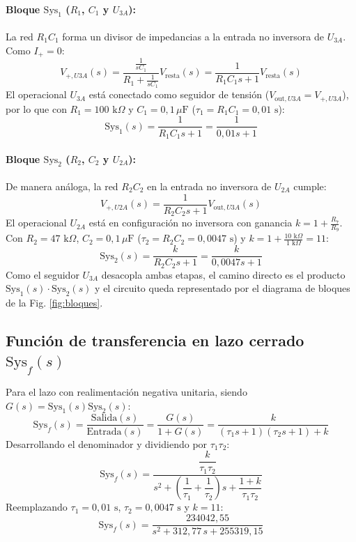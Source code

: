 \documentclass[11pt,a4paper]{article}
\begin{document}
\paragraph{Bloque $\text{Sys}_1$ ($R_1$, $C_1$ y $U_{3A}$):}
La red $R_1 C_1$ forma un divisor de impedancias a la entrada no inversora de $U_{3A}$. Como $I_+ = 0$:
\begin{equation}
    V_{+,U3A}(s) = \frac{\frac{1}{sC_1}}{R_1 + \frac{1}{sC_1}} V_{\text{resta}}(s) = \frac{1}{R_1 C_1 s + 1} V_{\text{resta}}(s)
\end{equation}
El operacional $U_{3A}$ está conectado como seguidor de tensión ($V_{\text{out},U3A} = V_{+,U3A}$), por lo que con $R_1 = 100\text{ k}\Omega$ y $C_1 = 0,1\,\mu\text{F}$ ($\tau_1 = R_1 C_1 = 0,01\text{ s}$):
\begin{equation}
    \text{Sys}_1(s) = \frac{1}{R_1 C_1 s + 1} = \frac{1}{0,01 s + 1}
\end{equation}

\paragraph{Bloque $\text{Sys}_2$ ($R_2$, $C_2$ y $U_{2A}$):}
De manera análoga, la red $R_2 C_2$ en la entrada no inversora de $U_{2A}$ cumple:
\begin{equation}
    V_{+,U2A}(s) = \frac{1}{R_2 C_2 s + 1} V_{\text{out},U3A}(s)
\end{equation}
El operacional $U_{2A}$ está en configuración no inversora con ganancia $k = 1 + \frac{R_7}{R_9}$. Con $R_2 = 47\text{ k}\Omega$, $C_2 = 0,1\,\mu\text{F}$ ($\tau_2 = R_2 C_2 = 0,0047\text{ s}$) y $k = 1 + \frac{10\text{ k}\Omega}{1\text{ k}\Omega} = 11$:
\begin{equation}
    \text{Sys}_2(s) = \frac{k}{R_2 C_2 s + 1} = \frac{k}{0,0047 s + 1}
\end{equation}
Como el seguidor $U_{3A}$ desacopla ambas etapas, el camino directo es el producto $\text{Sys}_1(s) \cdot \text{Sys}_2(s)$ y el circuito queda representado por el diagrama de bloques de la Fig. \ref{fig:bloques}.

\subsection{Función de transferencia en lazo cerrado $\text{Sys}_f(s)$}
Para el lazo con realimentación negativa unitaria, siendo $G(s) = \text{Sys}_1(s)\text{Sys}_2(s)$:
\begin{equation}
    \text{Sys}_f(s) = \frac{\text{Salida}(s)}{\text{Entrada}(s)} = \frac{G(s)}{1 + G(s)} = \frac{k}{(\tau_1 s + 1)(\tau_2 s + 1) + k}
\end{equation}
Desarrollando el denominador y dividiendo por $\tau_1 \tau_2$:
\begin{equation}
    \text{Sys}_f(s) = \frac{\dfrac{k}{\tau_1 \tau_2}}{s^2 + \left(\dfrac{1}{\tau_1} + \dfrac{1}{\tau_2}\right)s + \dfrac{1 + k}{\tau_1 \tau_2}}
\end{equation}
Reemplazando $\tau_1 = 0,01\text{ s}$, $\tau_2 = 0,0047\text{ s}$ y $k = 11$:
\begin{equation}
    \text{Sys}_f(s) = \frac{234042,55}{s^2 + 312,77\,s + 255319,15}
\end{equation}
\end{document}

